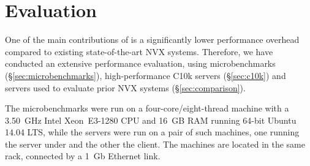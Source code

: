 \section{Evaluation}
\label{sec:evaluation}

One of the main contributions of \varan is a significantly lower
performance overhead compared to existing state-of-the-art NVX
systems.  Therefore, we have conducted an extensive performance
evaluation, using microbenchmarks (\S\ref{sec:microbenchmarks}),
high-performance C10k servers (\S\ref{sec:c10k}) and servers used to
evaluate prior NVX systems (\S\ref{sec:comparison}).

The microbenchmarks were run on a four-core/eight-thread machine with
a 3.50~GHz Intel Xeon~E3-1280 CPU and 16~GB RAM running 64-bit Ubuntu
14.04 LTS, while the servers were run on a pair of such machines, one
running the server under \varan and the other the client.  The machines
are located in the same rack, connected by a 1~Gb Ethernet link.




